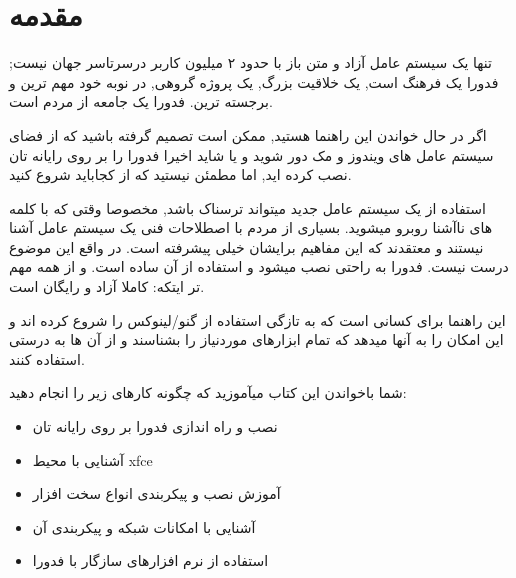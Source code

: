 	\section{مقدمه}\label{se-05}
تنها یک سیستم عامل آزاد و متن باز با حدود ۲ میلیون کاربر \cite{sta-fedora}
درسرتاسر جهان نیست; فدورا یک فرهنگ است, یک خلاقیت بزرگ, یک پروژه گروهی, در نوبه خود مهم ترین و برجسته ترین. فدورا یک جامعه از مردم است.

اگر در حال خواندن این راهنما هستید, ممکن است تصمیم گرفته باشید که از فضای سیستم عامل های   ویندوز  و مک  دور شوید و یا شاید اخیرا فدورا را بر روی رایانه تان نصب کرده اید, اما مطمئن نیستید که از کجاباید شروع کنید.

استفاده از یک سیستم عامل جدید میتواند ترسناک باشد, مخصوصا وقتی که با کلمه های ناآشنا روبرو میشوید. بسیاری از مردم با اصطلاحات فنی یک سیستم عامل آشنا نیستند و معتقدند که این مفاهیم برایشان خیلی پیشرفته است. در واقع این موضوع درست نیست. فدورا به راحتی نصب میشود و استفاده از آن ساده است. و از همه مهم تر ایتکه: کاملا آزاد و رایگان است.

این راهنما برای کسانی است که به تازگی استفاده از گنو/لینوکس  را شروع کرده اند و این امکان را به آنها میدهد که تمام ابزارهای موردنیاز را بشناسند و از آن ها به درستی استفاده کنند.

شما باخواندن این کتاب میآموزید که چگونه کارهای زیر را انجام دهید:
\begin{itemize}
	\item[\checkmark]
	نصب و راه اندازی فدورا بر روی رایانه تان
	\item[\checkmark]
آشنایی با محیط xfce
	\item[\checkmark]
آموزش نصب و پیکربندی انواع سخت افزار
	\item[\checkmark]
	آشنایی با امکانات شبکه و پیکربندی آن
	\item[\checkmark]
	استفاده از نرم افزارهای سازگار با فدورا
\end{itemize}
